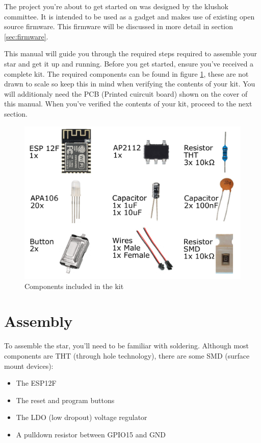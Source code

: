 \documentclass[12pt]{article}
\begin{document}
\noindent The project you're about to get started on was designed by the klushok committee. It is intended to be used as a gadget and makes use of existing open source firmware. This firmware will be discussed in more detail in section \ref{sec:firmware}.\vspace{1ex}

\noindent This manual will guide you through the required steps required to assemble your star and get it up and running.
Before you get started, ensure you've received a complete kit. The required components can be found in figure \ref{fig:kitContent}, these are not drawn to scale so keep this in mind when verifying the contents of your kit. You will additionaly  need the PCB (Printed cuircuit board) shown on the cover of this manual.
When you've verified the contents of your kit, proceed to the next section.

\begin{figure}[H]
	\centering
	\includegraphics[width=\textwidth]{../images/manual/partList.pdf}
	\caption{Components included in the kit}
	\label{fig:kitContent}
\end{figure}

\clearpage

\section{Assembly}

To assemble the star, you'll need to be familiar with soldering. Although most components are THT (through hole technology), there are some SMD (surface mount devices):
\begin{itemize}
	\item The ESP12F
	\item The reset and program buttons
	\item The LDO (low dropout) voltage regulator
	\item A pulldown resistor between GPIO15 and GND
\end{itemize}
\end{document}
